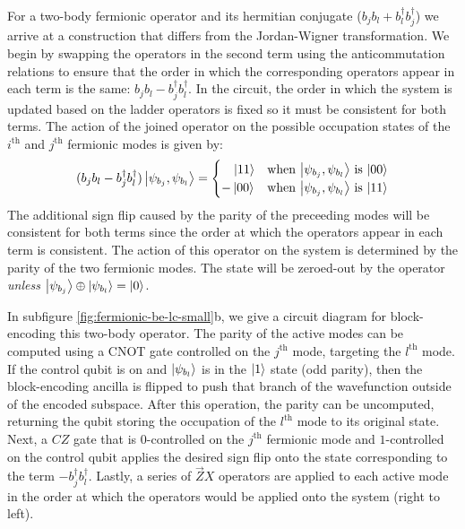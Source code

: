 For a two-body fermionic operator and its hermitian conjugate ($b_j b_l + b_l^\dagger b_j^\dagger$) we arrive at a construction that differs from the Jordan-Wigner transformation.
We begin by swapping the operators in the second term using the anticommutation relations to ensure that the order in which the corresponding operators appear in each term is the same: $b_j b_l - b_j^\dagger b_l^\dagger$.
In the circuit, the order in which the system is updated based on the ladder operators is fixed so it must be consistent for both terms.
The action of the joined operator on the possible occupation states of the $i^\text{th}$ and $j^\text{th}$ fermionic modes is given by:
\begin{equation}
    \begin{split}
        (b_j b_l - b_j^\dagger b_l^\dagger) \ket{\psi_{b_j}, \psi_{b_l}} = \begin{cases} 
            \hspace{1em}\ket{11} & \text{when $\ket{\psi_{b_j}, \psi_{b_l}}$ is $\ket{00}$} \\
            -\ket{00} & \text{when $\ket{\psi_{b_j}, \psi_{b_l}}$ is $\ket{11}$} \\
                                        \end{cases}
    \end{split}
\end{equation}
The additional sign flip caused by the parity of the preceeding modes will be consistent for both terms since the order at which the operators appear in each term is consistent.
The action of this operator on the system is determined by the parity of the two fermionic modes.
The state will be zeroed-out by the operator \textit{unless} $\ket{\psi_{b_j}} \oplus \ket{\psi_{b_l}} = \ket{0}$.

In subfigure \ref{fig:fermionic-be-lc-small}b, we give a circuit diagram for block-encoding this two-body operator.
The parity of the active modes can be computed using a CNOT gate controlled on the $j^\text{th}$ mode, targeting the $l^\text{th}$ mode.
If the control qubit is on and $\ket{\psi_{b_l}}$ is in the $\ket{1}$ state (odd parity), then the block-encoding ancilla is flipped to push that branch of the wavefunction outside of the encoded subspace.
After this operation, the parity can be uncomputed, returning the qubit storing the occupation of the $l^\text{th}$ mode to its original state.
Next, a $CZ$ gate that is $0$-controlled on the $j^\text{th}$ fermionic mode and $1$-controlled on the control qubit applies the desired sign flip onto the state corresponding to the term $- b_j^\dagger b_l^\dagger$.
Lastly, a series of $\vec{Z}X$ operators are applied to each active mode in the order at which the operators would be applied onto the system (right to left).


